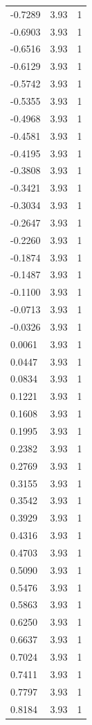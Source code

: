 \begin{longtable}{lrr}
  -0.7289 & 3.93 & 1 \\
  -0.6903 & 3.93 & 1 \\
  -0.6516 & 3.93 & 1 \\
  -0.6129 & 3.93 & 1 \\
  -0.5742 & 3.93 & 1 \\
  -0.5355 & 3.93 & 1 \\
  -0.4968 & 3.93 & 1 \\
  -0.4581 & 3.93 & 1 \\
  -0.4195 & 3.93 & 1 \\
  -0.3808 & 3.93 & 1 \\
  -0.3421 & 3.93 & 1 \\
  -0.3034 & 3.93 & 1 \\
  -0.2647 & 3.93 & 1 \\
  -0.2260 & 3.93 & 1 \\
  -0.1874 & 3.93 & 1 \\
  -0.1487 & 3.93 & 1 \\
  -0.1100 & 3.93 & 1 \\
  -0.0713 & 3.93 & 1 \\
  -0.0326 & 3.93 & 1 \\
  0.0061 & 3.93 & 1 \\
  0.0447 & 3.93 & 1 \\
  0.0834 & 3.93 & 1 \\
  0.1221 & 3.93 & 1 \\
  0.1608 & 3.93 & 1 \\
  0.1995 & 3.93 & 1 \\
  0.2382 & 3.93 & 1 \\
  0.2769 & 3.93 & 1 \\
  0.3155 & 3.93 & 1 \\
  0.3542 & 3.93 & 1 \\
  0.3929 & 3.93 & 1 \\
  0.4316 & 3.93 & 1 \\
  0.4703 & 3.93 & 1 \\
  0.5090 & 3.93 & 1 \\
  0.5476 & 3.93 & 1 \\
  0.5863 & 3.93 & 1 \\
  0.6250 & 3.93 & 1 \\
  0.6637 & 3.93 & 1 \\
  0.7024 & 3.93 & 1 \\
  0.7411 & 3.93 & 1 \\
  0.7797 & 3.93 & 1 \\
  0.8184 & 3.93 & 1 \\

\end{longtable}
